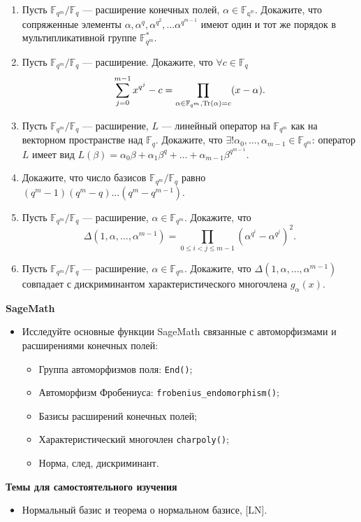 \begin{enumerate}[topsep=0pt]
    \item Пусть $\mathbb{F}_{q^m}/\mathbb{F}_q$ --- расширение конечных полей, $\alpha \in \mathbb{F_{q^m}}$. Докажите, что сопряженные элементы $\alpha, \alpha^q, \alpha^{q^2}, \dots \alpha^{q^{m-1}}$ имеют один и тот же порядок в мультипликативной группе $\mathbb{F}_{q^m}^*$.  %
    \item Пусть $\mathbb{F}_{q^m}/\mathbb{F}_q$ --- расширение. Докажите, что $\forall c\in \mathbb{F}_q$
    $$
        \sum_{j=0}^{m-1} x^{q^j} - c = \prod_{\alpha\in \mathbb{F}_{q^m}, \operatorname{Tr}(\alpha)=c} (x-\alpha).
    $$ %
    \item Пусть $\mathbb{F}_{q^m}/\mathbb{F}_q$ --- расширение, $L$ --- линейный оператор на $\mathbb{F}_{q^m}$ как на векторном пространстве над $\mathbb{F}_q$. Докажите, что $\exists ! \alpha_0, \dots, \alpha_{m-1}\in \mathbb{F}_{q^m}$: оператор $L$ имеет вид $L(\beta) = \alpha_0 \beta + \alpha_1 \beta^q + \dots + \alpha_{m-1}\beta^{q^{m-1}}$. %
    \item Докажите, что число базисов $\mathbb{F}_{q^m}/\mathbb{F}_q$ равно $(q^m-1)(q^m-q)\dots (q^m-q^{m-1})$. %
    \item Пусть $\mathbb{F}_{q^m}/\mathbb{F}_q$ --- расширение, $\alpha\in\mathbb{F}_{q^m}$. Докажите, что 
    $$
        \Delta(1,\alpha, \dots, \alpha^{m-1}) = \prod_{0\leqslant i < j \leqslant m-1} (\alpha^{q^i}-\alpha^{q^j})^2.
    $$ %
    \item Пусть $\mathbb{F}_{q^m}/\mathbb{F}_q$ --- расширение, $\alpha \in \mathbb{F}_{q^m}$. Докажите, что $\Delta(1,\alpha, \dots, \alpha^{m-1})$ совпадает с дискриминантом характеристического многочлена $g_\alpha(x)$. %
\end{enumerate}


\noindent\textbf{SageMath}
\begin{itemize}[topsep=0pt]
    \item Исследуйте основные функции SageMath связанные с автоморфизмами и расширениями конечных полей:
    \begin{itemize}[noitemsep,topsep=0pt]
        \item Группа автоморфизмов поля: \texttt{End()};
        \item Автоморфизм Фробениуса: \texttt{frobenius\_endomorphism()};
        \item Базисы расширений конечных полей;
        \item Характеристический многочлен \texttt{charpoly()};
        \item Норма, след, дискриминант.
     \end{itemize}
\end{itemize}

\noindent\textbf{Темы для самостоятельного изучения}
\begin{itemize}[topsep=0pt]
    \item Нормальный базис и теорема о нормальном базисе, [LN].
\end{itemize}    